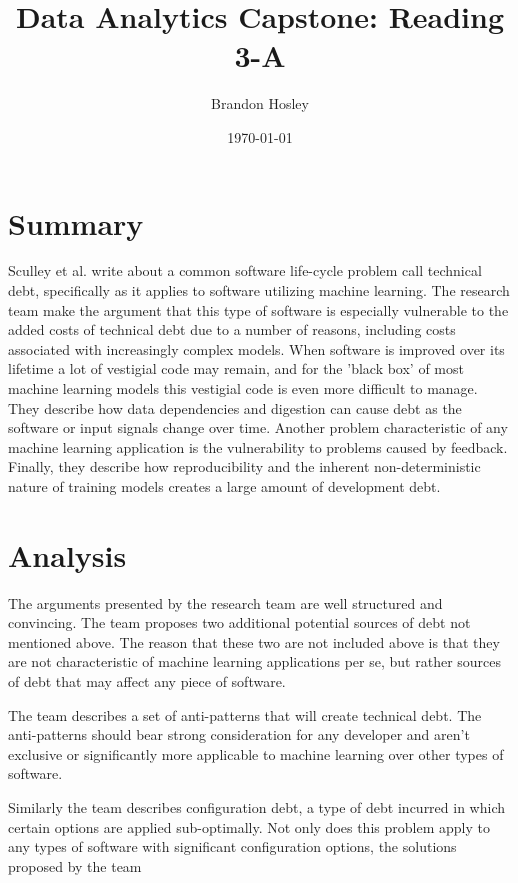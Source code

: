 \documentclass[]{article}
\title{Data Analytics Capstone: Reading 3-A}
\author{Brandon Hosley}
\date{\today}
\begin{document}
	\maketitle
	
\section{Summary} 

Sculley et al.\cite{Sculley2015} write about a common software life-cycle problem call technical debt, specifically as it applies to software utilizing machine learning. 
The research team make the argument that this type of software is especially vulnerable to the added costs of technical debt due to a number of reasons, including costs associated with increasingly complex models.
When software is improved over its lifetime a lot of vestigial code may remain, and for the 'black box' of most machine learning models this vestigial code is even more difficult to manage.
They describe how data dependencies and digestion can cause debt as the software or input signals change over time.
Another problem characteristic of any machine learning application is the vulnerability to problems caused by feedback.
Finally, they describe how reproducibility and the inherent non-deterministic nature of training models creates a large amount of development debt.

\section{Analysis}

The arguments presented by the research team are well structured and convincing.
The team proposes two additional potential sources of debt not mentioned above. 
The reason that these two are not included above is that they are not characteristic of machine learning applications per se, but rather sources of debt that may affect any piece of software.

The team describes a set of anti-patterns that will create technical debt.
The anti-patterns should bear strong consideration for any developer and aren't exclusive or significantly more applicable to machine learning over other types of software.

Similarly the team describes configuration debt,
a type of debt incurred in which certain options are applied sub-optimally.
Not only does this problem apply to any types of software with significant configuration options, the solutions proposed by the team 

\clearpage


\end{document}
